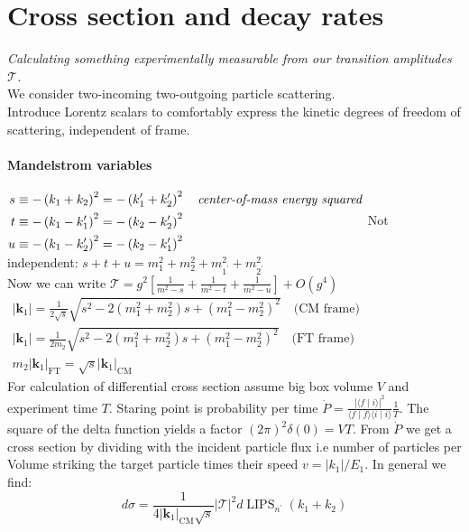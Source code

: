 \section{Cross section and decay rates}
\emph{Calculating something experimentally measurable from our transition amplitudes $\mathcal{T}$.}\\

We consider two-incoming two-outgoing particle scattering.\\
Introduce Lorentz scalars to comfortably express the kinetic degrees of freedom of scattering, independent
of frame. 
\paragraph{Mandelstrom variables}
$\begin{aligned} s & \equiv-\left(k_1+k_2\right)^2=-\left(k_1^{\prime}+k_2^{\prime}\right)^2 \quad \emph{center-of-mass energy squared}\\
   t & \equiv-\left(k_1-k_1^{\prime}\right)^2=-\left(k_2-k_2^{\prime}\right)^2 \\
   u & \equiv-\left(k_1-k_2^{\prime}\right)^2=-\left(k_2-k_1^{\prime}\right)^2 \end{aligned}$
Not independent: $s+t+u=m_1^2+m_2^2+m_{1^{\prime}}^2+m_{2^{\prime}}^2$\\

Now we can write $\mathcal{T}=g^2\left[\frac{1}{m^2-s}+\frac{1}{m^2-t}+\frac{1}{m^2-u}\right]+O\left(g^4\right)$\\
$\begin{aligned}\left|\mathbf{k}_1\right|=\frac{1}{2 \sqrt{s}} \sqrt{s^2-2\left(m_1^2+m_2^2\right) s+\left(m_1^2-m_2^2\right)^2}
\quad \text{(CM frame)}\\
\left|\mathbf{k}_1\right|=\frac{1}{2 m_2} \sqrt{s^2-2\left(m_1^2+m_2^2\right) s+\left(m_1^2-m_2^2\right)^2} \quad \text{(FT frame)}\\
m_2\left|\mathbf{k}_1\right|_{\mathrm{FT}}=\sqrt{s}\left|\mathbf{k}_1\right|_{\mathrm{CM}} \end{aligned}$\\

For calculation of differential cross section assume big box volume $V$ and experiment time $T$. Staring 
point is probability per time $\dot{P} =\frac{|\langle f \mid i\rangle|^2}{\langle f \mid f\rangle\langle i \mid i\rangle} \frac{1}{T}$.
The square of the delta function yields a factor $(2\pi)^2\delta(0)=VT$. From $\dot{P}$ we get a cross section
by dividing with the incident particle flux i.e number of particles per Volume striking the target particle times their speed $v=|k_1|/E_1$.
In general we find: 
$$d \sigma=\frac{1}{4\left|\mathbf{k}_1\right|_{\mathrm{CM}} \sqrt{s}}|\mathcal{T}|^2 d \operatorname{LIPS}_{n^{\prime}}\left(k_1+k_2\right)$$

